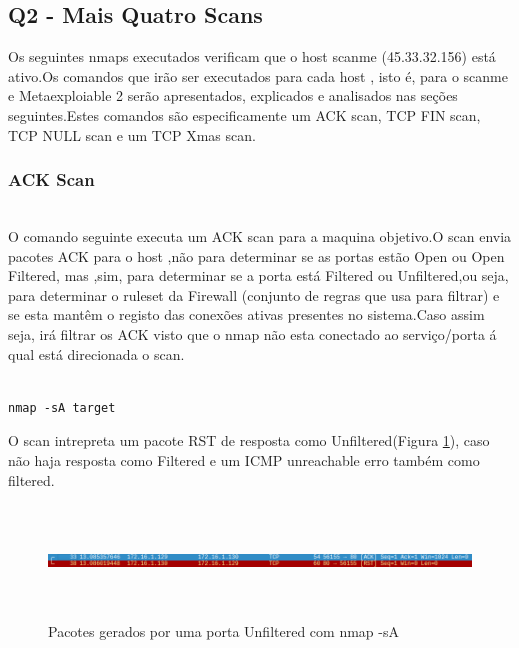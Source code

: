 \subsection{Q2 - Mais Quatro Scans}

Os seguintes nmaps executados verificam que o host scanme (45.33.32.156) está ativo.Os comandos que irão ser executados para cada host , isto é, para o scanme e Metaexploiable 2 serão apresentados, explicados e analisados nas seções seguintes.Estes comandos são especificamente um ACK scan, TCP FIN scan, TCP NULL scan e um TCP Xmas scan.

\subsubsection{ACK Scan}
\hfill\\

O comando seguinte executa um ACK scan para a maquina objetivo.O scan envia pacotes ACK para o host ,não para determinar se as portas estão Open ou Open Filtered, mas ,sim, para determinar se a porta está Filtered ou Unfiltered,ou seja, para determinar o ruleset da Firewall (conjunto de regras que usa para filtrar) e se esta mantêm o registo das conexões ativas presentes no sistema.Caso assim seja, irá filtrar os ACK visto que o nmap não esta conectado ao serviço/porta á qual está direcionada o scan.

\begin{lstlisting}

nmap -sA target

\end{lstlisting}

O scan intrepreta um pacote RST de resposta como Unfiltered(Figura \ref{fig:nmapsAUnfiltered}), caso não haja resposta como Filtered e um ICMP unreachable erro também como filtered.

\begin{figure}[h!]
	\centering
		
	\includegraphics[width=\textwidth,height=3cm,keepaspectratio]{images/nmapsAUnfiltered.png}
		
	\caption{Pacotes gerados por uma porta Unfiltered com nmap -sA}
		
	\label{fig:nmapsAUnfiltered}
\end{figure}

